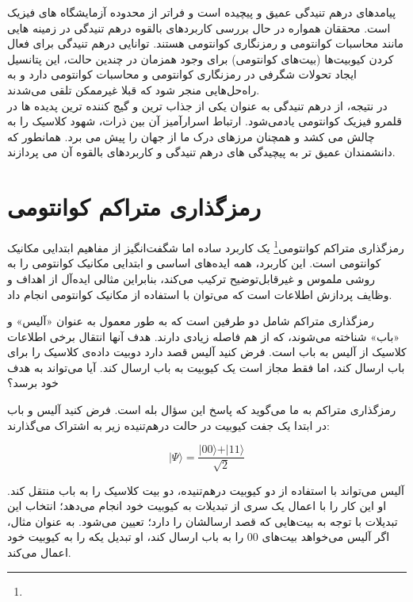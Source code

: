 \documentclass{book}
\begin{document}
پیامدهای درهم تنیدگی عمیق و پیچیده است و فراتر از محدوده آزمایشگاه های فیزیک است. محققان همواره در حال بررسی کاربردهای بالقوه درهم تنیدگی در زمینه هایی مانند محاسبات کوانتومی و رمزنگاری کوانتومی هستند. توانایی درهم تنیدگی برای فعال کردن کیوبیت‌ها (بیت‌های کوانتومی) برای وجود همزمان در چندین حالت، این پتانسیل ایجاد تحولات شگرفی در رمزنگاری کوانتومی و محاسبات کوانتومی دارد و به راه‌حل‌هایی منجر شود که قبلا غیرممکن تلقی می‌شدند.\\

در نتیجه، از درهم تنیدگی به عنوان یکی از جذاب ترین و گیج کننده ترین پدیده ها در قلمرو فیزیک کوانتومی یاد‌می‌شود. ارتباط اسرارآمیز آن بین ذرات، شهود کلاسیک را به چالش می کشد و همچنان مرزهای درک ما از جهان را پیش می برد. همانطور که دانشمندان عمیق تر به پیچیدگی های درهم تنیدگی و کاربردهای بالقوه آن می پردازند.

\newpage

\section{رمزگذاری متراکم کوانتومی}

رمزگذاری متراکم کوانتومی\footnote{} یک کاربرد ساده اما شگفت‌انگیز از مفاهیم ابتدایی مکانیک کوانتومی است. این کاربرد، همه ایده‌های اساسی و ابتدایی مکانیک کوانتومی را به روشی ملموس و غیرقابل‌توضیح ترکیب می‌کند، بنابراین مثالی ایده‌آل از اهداف و وظایف پردازش اطلاعات است که می‌توان با استفاده از مکانیک کوانتومی انجام داد.

رمزگذاری متراکم شامل دو طرفین است که به طور معمول به عنوان «آلیس» و «باب» شناخته می‌شوند، که از هم فاصله زیادی دارند. هدف آنها انتقال برخی اطلاعات کلاسیک از آلیس به باب است. فرض کنید آلیس قصد دارد دوبیت داده‌ی کلاسیک را برای باب ارسال کند، اما فقط مجاز است یک کیوبیت به باب ارسال کند. آیا می‌تواند به هدف خود برسد؟

رمزگذاری متراکم به ما می‌گوید که پاسخ این سؤال بله است. فرض کنید آلیس و باب در ابتدا یک جفت کیوبیت در حالت درهم‌تنیده زیر به اشتراک می‌گذارند:
\begin{center}
\begin{equation}\label{entangel psi}
\vert \Psi \rangle = \frac{\vert 00 \rangle + \vert 11\rangle}{\sqrt{2}}
\end{equation}	
\end{center}


آلیس می‌تواند با استفاده از دو کیوبیت درهم‌تنیده، دو بیت کلاسیک را به باب منتقل کند. او این کار را با اعمال یک سری از تبدیلات به کیوبیت خود انجام می‌دهد؛ انتخاب این تبدیلات با توجه به بیت‌هایی که قصد ارسالشان را دارد؛‌ تعیین می‌شود.  به عنوان مثال، اگر آلیس می‌خواهد بیت‌های 00 را به باب ارسال کند، او تبدیل یکه را به کیوبیت خود اعمال می‌کند.
\end{document}
